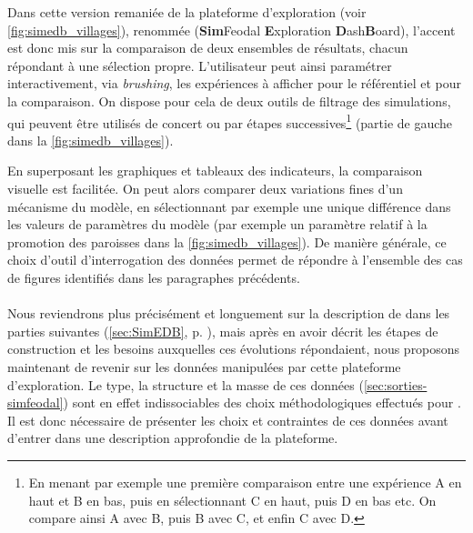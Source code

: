 Dans cette version remaniée de la plateforme d'exploration (voir \cref{fig:simedb_villages}), renommée \simedb{}\label{par:introduction-nom-simedb} (\textbf{Sim}Feodal \textbf{E}xploration \textbf{D}ash\textbf{B}oard), l'accent est donc mis sur la comparaison de deux ensembles de résultats, chacun répondant à une sélection propre.
L'utilisateur peut ainsi \og paramétrer\fg{} interactivement, via \textit{brushing}, les expériences à afficher pour le référentiel et pour la comparaison.
On dispose pour cela de deux outils de filtrage des simulations, qui peuvent être utilisés de concert ou par étapes successives\footnote{
	En menant par exemple une première comparaison entre une expérience \og A\fg{} en haut et \og B\fg{} en bas, puis en sélectionnant \og C\fg{} en haut, puis \og D\fg{} en bas etc.
	On compare ainsi A avec B, puis B avec C, et enfin C avec D.
} (partie de gauche dans la \cref{fig:simedb_villages}).

En superposant les graphiques et tableaux des indicateurs, la comparaison visuelle est facilitée.
On peut alors comparer deux variations fines d'un mécanisme du modèle, en sélectionnant par exemple une unique différence dans les valeurs de paramètres du modèle (par exemple un paramètre relatif à la promotion des paroisses dans la \cref{fig:simedb_villages}).
De manière générale, ce choix d'outil d'interrogation des données permet de répondre à l'ensemble des cas de figures identifiés dans les paragraphes précédents.

\paragraph[Conclusion intermédiaire]{}
Nous reviendrons plus précisément et longuement sur la description de \simedb{} dans les parties suivantes (\cref{sec:SimEDB}, p. \pageref{sec:SimEDB}), mais après en avoir décrit les étapes de construction et les besoins auxquelles ces évolutions répondaient, nous proposons maintenant de revenir sur les données manipulées par cette plateforme d'exploration.
Le type, la structure et la masse de ces données (\cref{sec:sorties-simfeodal}) sont en effet indissociables des choix méthodologiques effectués pour \simedb{}.
Il est donc nécessaire de présenter les choix et contraintes de ces données avant d'entrer dans une description approfondie de la plateforme.
\clearpage

